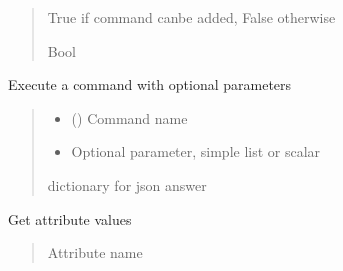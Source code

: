 \documentclass[letterpaper,10pt,english]{sphinxmanual}
\begin{document}
\begin{fulllineitems}
\begin{fulllineitems}
\begin{quote}
\begin{description}
\sphinxAtStartPar
True if command canbe added, False otherwise

\sphinxAtStartPar
Bool

\end{description}\end{quote}

\end{fulllineitems}


\begin{fulllineitems}
\label{\detokenize{webserverdocs:HardwareBaseClass.HardwareBaseDevice.execute_command}}
\pysigstartsignatures
{}
\pysigstopsignatures
\sphinxAtStartPar
Execute a command with optional parameters
\begin{quote}\begin{description}
\begin{itemize}
\item {} 
\sphinxAtStartPar
{} () \textendash{} Command name

\item {} 
\sphinxAtStartPar
{} \textendash{} Optional parameter, simple list or scalar

\end{itemize}

\sphinxAtStartPar
dictionary for json answer

\end{description}\end{quote}

\end{fulllineitems}


\begin{fulllineitems}
\label{\detokenize{webserverdocs:HardwareBaseClass.HardwareBaseDevice.get_attribute}}
\pysigstartsignatures
{}
\pysigstopsignatures
\sphinxAtStartPar
Get attribute values
\begin{quote}\begin{description}
\sphinxAtStartPar
{} \textendash{} Attribute name


\end{description}
\end{quote}
\end{fulllineitems}
\end{fulllineitems}
\end{document}
